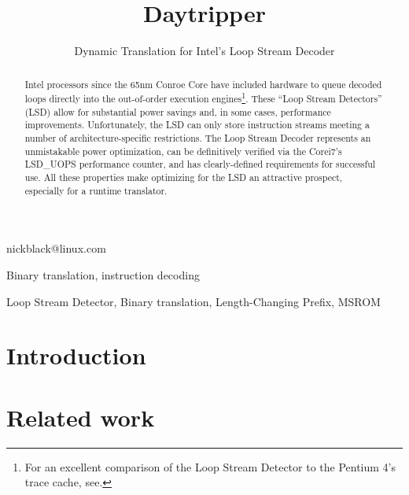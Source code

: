 \documentclass[]{sigplanconf}
\begin{document}

\title{Daytripper}
\subtitle{Dynamic Translation for Intel's Loop Stream Decoder}

           {nickblack@linux.com}

\maketitle

\begin{abstract}
Intel processors since the 65nm Conroe Core
have included hardware to queue decoded loops directly into the out-of-order
execution engines\footnote{For an excellent comparison of the Loop Stream
Detector to the Pentium 4's trace cache, see\cite{kanter}.}. These ``Loop
Stream Detectors'' (LSD) allow for substantial power savings and, in some
cases, performance improvements. Unfortunately, the LSD can only store
instruction streams meeting a number of architecture-specific restrictions.
The Loop Stream Decoder represents an unmistakable power optimization, can be
definitively verified via the Core\texttrademark i7's LSD\_UOPS performance
counter, and has clearly-defined requirements for successful use. All these
properties make optimizing for the LSD an attractive prospect, especially for
a runtime translator.  
\end{abstract}


\terms
Binary translation, instruction decoding

\keywords
Loop Stream Detector, Binary translation, Length-Changing Prefix, MSROM

\section{Introduction}
\cite{inteloptimize}

\section{Related work}
\end{document}

